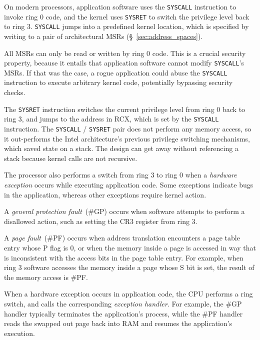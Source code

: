 
On modern processors, application software uses the \texttt{SYSCALL}
instruction to invoke ring 0 code, and the kernel uses \texttt{SYSRET} to
switch the privilege level back to ring 3. \texttt{SYSCALL} jumps into a
predefined kernel location, which is specified by writing to a pair of
architectural MSRs (\S~\ref{sec:address_spaces}).

All MSRs can only be read or written by ring 0 code. This is a crucial security
property, because it entails that application software cannot modify
\texttt{SYSCALL}'s MSRs. If that was the case, a rogue application could abuse
the \texttt{SYSCALL} instruction to execute arbitrary kernel code, potentially
bypassing security checks.

The \texttt{SYSRET} instruction switches the current privilege level from ring
0 back to ring 3, and jumps to the address in RCX, which is set by the
\texttt{SYSCALL} instruction. The \texttt{SYSCALL} / \texttt{SYSRET} pair does
not perform any memory access, so it out-performs the Intel architecture's
previous privilege switching mechanisms, which saved state on a stack. The
design can get away without referencing a stack because kernel calls are not
recursive.


\label{sec:faults}


The processor also performs a switch from ring 3 to ring 0 when a
\textit{hardware exception} occurs while executing application code. Some
exceptions indicate bugs in the application, whereas other exceptions require
kernel action.

A \textit{general protection fault}~(\#GP) occurs when software attempts to
perform a disallowed action, such as setting the CR3 register from ring 3.

A \textit{page fault}~(\#PF) occurs when address translation encounters a page
table entry whose P flag is 0, or when the memory inside a page is accessed in
way that is inconsistent with the access bits in the page table entry. For
example, when ring 3 software accesses the memory inside a page whose S bit is
set, the result of the memory access is \#PF.


When a hardware exception occurs in application code, the CPU performs a ring
switch, and calls the corresponding \textit{exception handler}. For example,
the \#GP handler typically terminates the application's process, while the \#PF
handler reads the swapped out page back into RAM and resumes the application's
execution.

